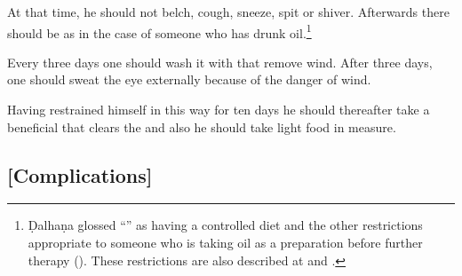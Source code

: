 \begin{translation}
    \item[61]
    At that time, he should not belch, cough, sneeze, spit or shiver.  Afterwards there should be 
     as in the case of someone who has drunk 
    oil.\footnote{Ḍalhaṇa glossed “” as having a controlled diet 
    and 
    the other restrictions appropriate to someone who is taking oil as a preparation before 
    further 
    therapy (). These restrictions are also described at  
    and   .}
    
    
    \item[62]
    
    Every three days one should wash it with 
     that remove wind.
    After three days, one should sweat the eye externally because of the danger of wind. 
    
    \item[63]
    Having restrained himself in this way for ten days he should thereafter take a beneficial 
     that clears the  and also he should take light food 
    in 
    measure.
    
\end{translation}

\subsection{[Complications]}

